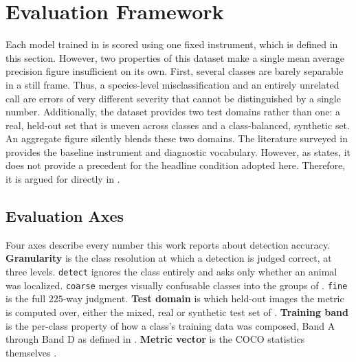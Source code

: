 \section{Evaluation Framework}\label{sec:evaluation_framework}

Each model trained in  is scored using one fixed instrument, which is defined in this section. However, two properties of this dataset make a single mean average precision figure insufficient on its own. First, several classes are barely separable in a still frame. Thus, a species-level misclassification and an entirely unrelated call are errors of very different severity that cannot be distinguished by a single number. Additionally, the dataset provides two test domains rather than one: a real, held-out set that is uneven across classes and a class-balanced, synthetic set. An aggregate figure silently blends these two domains. The literature surveyed in  provides the baseline instrument and diagnostic vocabulary. However, as  states, it does not provide a precedent for the headline condition adopted here. Therefore, it is argued for directly in .

\subsection{Evaluation Axes}\label{sec:evaluation_axes}

Four axes describe every number this work reports about detection accuracy. \textbf{Granularity} is the class resolution at which a detection is judged correct, at three levels. \texttt{detect} ignores the class entirely and asks only whether an animal was localized. \texttt{coarse} merges visually confusable classes into the groups of . \texttt{fine} is the full $225$-way judgment. \textbf{Test domain} is which held-out images the metric is computed over, either the mixed, real or synthetic test set of . \textbf{Training band} is the per-class property of how a class's training data was composed, Band A through Band D as defined in . \textbf{Metric vector} is the COCO statistics themselves \cite{linMicrosoftCOCOCommon2015}.

